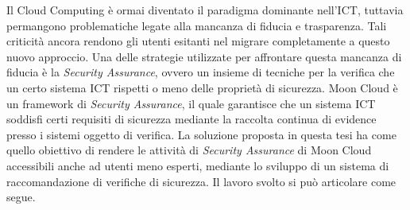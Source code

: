 \documentclass[10pt,a4paper]{article}
\begin{document}
\hfill\break
Il Cloud Computing è ormai diventato il paradigma dominante nell'ICT, tuttavia permangono problematiche legate alla mancanza di fiducia e trasparenza. 
Tali criticità ancora rendono gli utenti esitanti nel migrare completamente a questo nuovo approccio. 
Una delle strategie utilizzate per affrontare questa mancanza di fiducia è la \textit{Security Assurance}, ovvero un insieme di tecniche 
per la verifica che un certo sistema ICT rispetti o meno delle proprietà di sicurezza.\hfill\break
%
Moon Cloud è un framework di \textit{Security Assurance}, il quale garantisce che un sistema ICT soddisfi certi requisiti di sicurezza mediante la 
raccolta continua di evidence presso i sistemi oggetto di verifica.\hfill\break
%
La soluzione proposta in questa tesi ha come quello obiettivo di rendere le attività di \textit{Security Assurance} di Moon Cloud accessibili anche 
ad utenti meno esperti, mediante lo sviluppo di un sistema di raccomandazione di verifiche di sicurezza. Il lavoro svolto si può articolare come segue.
\end{document}
